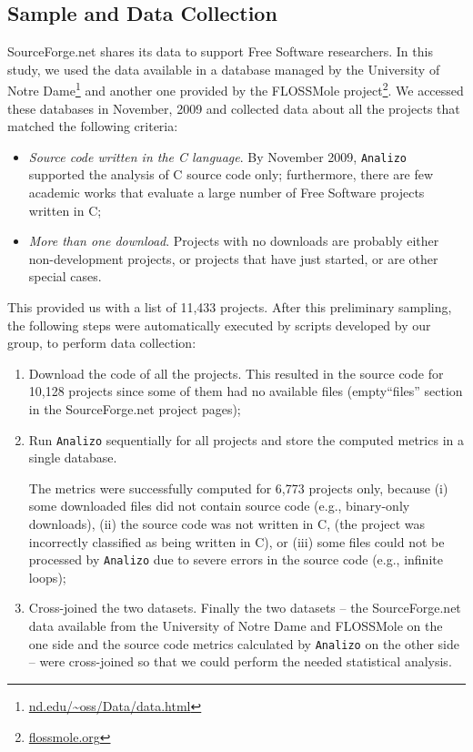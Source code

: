 \documentclass[conference]{IEEEtran}
\begin{document}
\subsection{Sample and Data Collection}
\label{sdcollection}

SourceForge.net shares its data to support Free Software researchers.
%
In this study, we used the data available in a database managed by
the University of Notre Dame\footnote{\url{nd.edu/~oss/Data/data.html}}
and another one provided by the FLOSSMole project\footnote{\url{flossmole.org}}.
%
We accessed these databases in November, 2009 and collected data about
all the projects that matched the following criteria:
%
\begin{itemize}
\item \emph{Source code written in the C language}. By November 2009, \texttt{Analizo} supported 
the analysis of C source code only; furthermore, there are few academic works that evaluate
a large number of Free Software projects written in C;  %
%
\item \emph{More than one download}.  Projects with no downloads are
probably either non-development projects, or projects that have just started,
or are other special cases.
\end{itemize}

This provided us with a list of 11,433 projects. 
After this preliminary sampling, the following steps were automatically executed  by scripts developed by our group,
to perform data collection:
\begin{enumerate}
\item Download the code of all the projects. This resulted in the source code for 10,128 projects since
some of them had no available files (empty``files'' section in the SourceForge.net project pages);

\item Run \texttt{Analizo} sequentially for all projects and store the computed metrics in a single database.
%

The metrics were successfully computed for 6,773 projects only, because
(i) some downloaded files did not contain source code (e.g., binary-only downloads),
%
(ii) the source code was not written in C, (the project was incorrectly classified as being written in C), or
%
(iii) some files could not be processed by \texttt{Analizo} due to severe
errors in the source code (e.g., infinite loops);

\item Cross-joined the two datasets. Finally the two datasets -- the SourceForge.net data available
from the University of Notre Dame and FLOSSMole on the one side and the source
code metrics calculated by \texttt{Analizo} on the other side --  were cross-joined so that
we could perform the needed statistical analysis. 
\end{enumerate}
\end{document}
